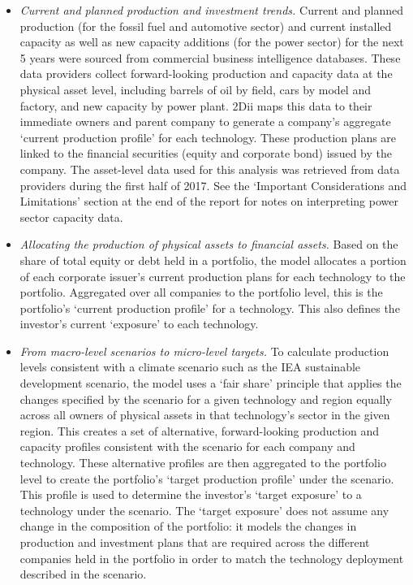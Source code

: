 \documentclass[10pt,table,a4]{article}\usepackage[]{graphicx}\usepackage[]{color}
\begin{document}
\begin{multicols}{2}
		\begin{itemize}
			\item{\textit{Current and planned production and investment trends.} Current and planned production (for the fossil fuel and automotive sector) and current installed capacity as well as new capacity additions (for the power sector) for the next 5 years were sourced from commercial business intelligence databases. These data providers collect forward-looking production and capacity data at the physical asset level, including barrels of oil by field, cars by model and factory, and new capacity by power plant. 2Dii maps this data to their immediate owners and parent company to generate a company's aggregate `current production profile' for each technology. These production plans are linked to the financial securities (equity and corporate bond) issued by the company. The asset-level data used for this analysis was retrieved from data providers during the first half of 2017. See the `Important Considerations and Limitations' section at the end of the report for notes on interpreting power sector capacity data.}
			
			\item{\textit{Allocating the production of physical assets to financial assets.} Based on the share of total equity or debt held in a portfolio, the model allocates a portion of each corporate issuer's current production plans for each technology to the portfolio. Aggregated over all companies to the portfolio level, this is the portfolio's `current production profile' for a technology. This also defines the investor's current `exposure' to each technology.}
			
			\item{\textit{From macro-level scenarios to micro-level targets. }To calculate production levels consistent with a climate scenario such as the IEA sustainable development scenario, the model uses a `fair share' principle that applies the changes specified by the scenario for a given technology and region equally across all owners of physical assets in that technology's sector in the given region. This creates a set of alternative, forward-looking production and capacity profiles consistent with the scenario for each company and technology. These alternative profiles are then aggregated to the portfolio level to create the portfolio's `target production profile' under the scenario. This profile is used to determine the investor's `target exposure' to a technology under the scenario. The `target exposure' does not assume any change in the composition of the portfolio: it models the changes in production and investment plans that are required across the different companies held in the portfolio in order to match the technology deployment described in the scenario.} 
			

\end{itemize}
\end{multicols}
\end{document}
